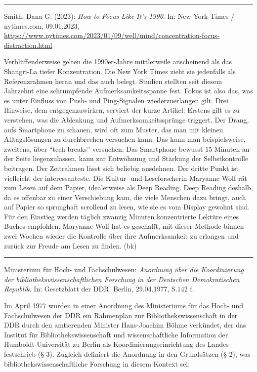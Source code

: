 \documentclass[a4paper,
fontsize=11pt,
oneside,
numbers=noperiodatend,
parskip=half-,
bibliography=totoc,
final
]{scrartcl}
\begin{document}
\begin{center}\rule{0.5\linewidth}{0.5pt}\end{center}

Smith, Dana G. (2023): \emph{How to Focus Like It's 1990}. In: New York
Times / nytimes.com, 09.01.2023,
\url{https://www.nytimes.com/2023/01/09/well/mind/concentration-focus-distraction.html}

Verblüffenderweise gelten die 1990er-Jahre mittlerweile anscheinend als
das Shangri-La tiefer Konzentration. Die New York Times zieht sie
jedenfalls als Referenzrahmen heran und das auch belegt. Studien
stellten seit diesem Jahrzehnt eine schrumpfende Aufmerksamkeitsspanne
fest. Fokus ist also das, was es unter Einfluss von Push- und
Ping-Signalen wiederzuerlangen gilt. Drei Hinweise, dem
entgegenzuwirken, serviert der kurze Artikel: Erstens gilt es zu
verstehen, was die Ablenkung und Aufmerksamkeitssprünge triggert. Der
Drang, aufs Smartphone zu schauen, wird oft zum Muster, das man mit
kleinen Alltagslösungen zu durchbrechen versuchen kann. Das kann man
beispielsweise, zweitens, über \enquote{tech breaks} versuchen. Das
Smartphone bewusst 15 Minuten an der Seite liegenzulassen, kann zur
Entwöhnung und Stärkung der Selbstkontrolle beitragen. Der Zeitrahmen
lässt sich beliebig ausdehnen. Der dritte Punkt ist vielleicht der
interessanteste. Die Kultur- und Leseforscherin Maryanne Wolf rät zum
Lesen auf dem Papier, idealerweise als Deep Reading. Deep Reading
deshalb, da es offenbar zu einer Verschiebung kam, die viele Menschen
dazu bringt, auch auf Papier so sprunghaft scrollend zu lesen, wie sie
es vom Display gewohnt sind. Für den Einstieg werden täglich zwanzig
Minuten konzentrierte Lektüre eines Buches empfohlen. Maryanne Wolf hat
es geschafft, mit dieser Methode binnen zwei Wochen wieder die Kontrolle
über ihre Aufmerksamkeit zu erlangen und zurück zur Freude am Lesen zu
finden. (bk)

\begin{center}\rule{0.5\linewidth}{0.5pt}\end{center}

Ministerium für Hoch- und Fachschulwesen: \emph{Anordnung über die
Koordinierung der bibliothekswissenschaftlichen Forschung in der
Deutschen Demokratischen Republik.} In: Gesetzblatt der DDR. Berlin,
29.04.1977, S.142 f.

Im April 1977 wurden in einer Anordnung des Ministeriums für das Hoch-
und Fachschulwesen der DDR ein Rahmenplan zur Bibliothekswissenschaft in
der DDR durch den amtierenden Minister Hans-Joachim Böhme verkündet, der
das Institut für Bibliothekswissenschaft und wissenschaftliche
Information der Humboldt-Universität zu Berlin als
Koordinierungseinrichtung des Landes festschrieb (§ 3). Zugleich
definiert die Anordnung in den Grundsätzen (§ 2), was
bibliothekswissenschaftliche Forschung in diesem Kontext sei:
\end{document}
